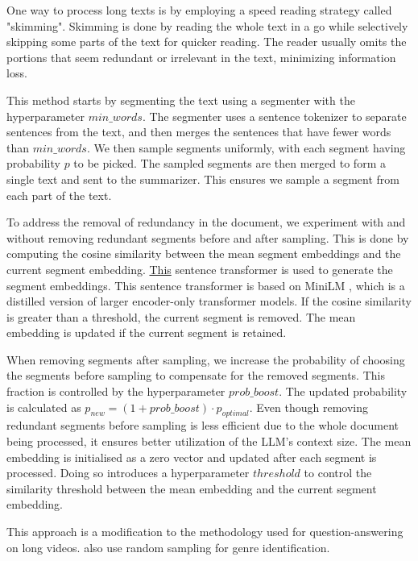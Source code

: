 		One way to process long texts is by employing a speed reading strategy called "skimming".
		Skimming is done by reading the whole text in a go while selectively skipping some
		parts of the text for quicker reading.
		The reader usually omits the portions that seem redundant or irrelevant in the text,
		minimizing information loss.

		This method starts by segmenting the text using a segmenter with the hyperparameter $min\_words$.
		The segmenter uses a sentence tokenizer to separate sentences from the text, and then
		merges the sentences that have fewer words than $min\_words$.
		We then sample segments uniformly, with each segment having probability $p$ to be picked.
		The sampled segments are then merged to form a single text and sent to the summarizer.
		This ensures we sample a segment from each part of the text.

		To address the removal of redundancy in the document, we experiment with and without removing
		redundant segments before and after sampling.
		This is done by computing the cosine similarity between the mean segment embeddings and the
		current segment embedding.
		\href{https://huggingface.co/sentence-transformers/all-MiniLM-L6-v2}{This} sentence transformer
		is used to generate the segment embeddings.
		This sentence transformer is based on MiniLM \cite{wang2020minilm}, which is a distilled version
		of larger encoder-only transformer models.
		If the cosine similarity is greater than a threshold, the current segment is removed.
		The mean embedding is updated if the current segment is retained.

		When removing segments after sampling, we increase the probability of choosing the segments
		before sampling to compensate for the removed segments.
		This fraction is controlled by the hyperparameter $prob\_boost$.
		The updated probability is calculated as $p_{new} = (1 + prob\_boost) \cdot p_{optimal}$.
		Even though removing redundant segments before sampling is less efficient due
		to the whole document being processed, it ensures better utilization of the
		LLM's context size.
		The mean embedding is initialised as a zero vector and updated after each segment is processed.
		Doing so introduces a hyperparameter $threshold$ to control the similarity threshold between the
		mean embedding and the current segment embedding.

		This approach is a modification to the methodology \citet{wang2024videoagent} used for
		question-answering on long videos. \citet{worsham-kalita-2018-genre} also use random sampling
		for genre identification.


